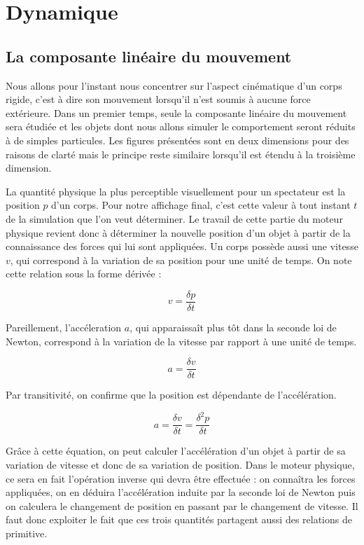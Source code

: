\section{Dynamique} 

\subsection{La composante linéaire du mouvement}

Nous allons pour l'instant nous concentrer sur l'aspect cinématique d'un corps rigide, c'est à dire son mouvement lorsqu'il n'est soumis à aucune force extérieure. Dans un premier temps, seule la composante linéaire du mouvement sera étudiée et les objets dont nous allons simuler le comportement seront réduits à de simples particules. Les figures présentées sont en deux dimensions pour des raisons de clarté mais le principe reste similaire lorsqu'il est étendu à la troisième dimension.

La quantité physique la plus perceptible visuellement pour un spectateur est la position $p$ d'un corps. Pour notre affichage final, c'est cette valeur à tout instant $t$ de la simulation que l'on veut déterminer. Le travail de cette partie du moteur physique revient donc à déterminer la nouvelle position d'un objet à partir de la connaissance des forces qui lui sont appliquées. Un corps possède aussi une vitesse $v$, qui correspond à la variation de sa position pour une unité de temps. On note cette relation sous la forme dérivée :

\[v = \frac{\delta p}{\delta t}\]

Pareillement, l'accéleration $a$, qui apparaissaît plus tôt dans la seconde loi de Newton, correspond à la variation de la vitesse par rapport à une unité de temps.

\[a = \frac{\delta v}{\delta t}\]

Par transitivité, on confirme que la position est dépendante de l'accélération.

\[a = \frac{\delta v}{\delta t} = \frac{\delta^2 p}{\delta t}\]

Grâce à cette équation, on peut calculer l'accélération d'un objet à partir de sa variation de vitesse et donc de sa variation de position. Dans le moteur physique, ce sera en fait l'opération inverse qui devra être effectuée : on connaîtra les forces appliquées, on en déduira l'accélération induite par la seconde loi de Newton puis on calculera le changement de position en passant par le changement de vitesse. Il faut donc exploiter le fait que ces trois quantités partagent aussi des relations de primitive.

